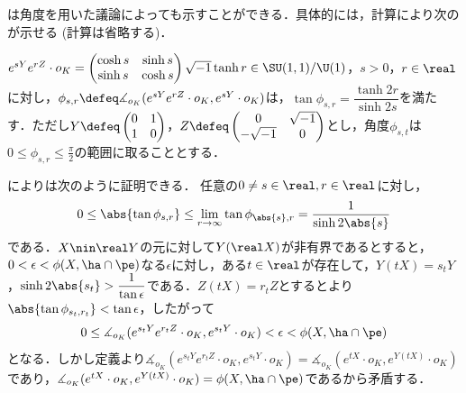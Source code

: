 \begin{rem}\label{rem:su11-by-angle}

  は角度を用いた議論によっても示すことができる．具体的には，計算により次のが示せる (計算は省略する)．
  \begin{lem}\label{lem:0106}
    $e^{sY}e^{rZ}\cdot o_K =
    \begin{pmatrix}
      \cosh s & \sinh s\\ \sinh s & \cosh s
    \end{pmatrix}
    \sqrt{-1}\tanh r \in \SU(1,1)/\U(1) $，$s > 0$，$r\in \real$に対し，$\phi_{s,r}\defeq \measuredangle_{o_K}(e^{sY}e^{rZ}\cdot o_K, e^{sY}\cdot o_K) $は，$\tan \phi_{s,r} = \dfrac{\tanh 2r}{\sinh 2s} $を満たす．ただし$Y \defeq
  \begin{pmatrix}
    0 & 1\\ 1 & 0
  \end{pmatrix}
  $，$Z \defeq \begin{pmatrix}
    0 & \sqrt{-1} \\ -\sqrt{-1} & 0
  \end{pmatrix}$とし，角度$\phi_{s,t} $は$0\leq \phi_{s,r}\leq \frac{\pi}{2} $の範囲に取ることとする．
  \end{lem}  

  によりは次のように証明できる．
  任意の$0\neq s\in \real, r\in \real $に対し，
  \begin{align}
    0 \leq \abs{\tan \phi_{s,r}} \leq  \lim_{r\to \infty}\tan \phi_{\abs{s},r} = \dfrac{1}{\sinh 2\abs{s}}\label{eq:0106}
  \end{align}
  である．$X\nin \real Y $の元に対して$Y(\real X) $が非有界であるとすると，$ 0 <  \epsilon < \phi(X,\ha\cap\pe)$なる$\epsilon$に対し，ある$t\in \real $が存在して，$Y(tX) = s_tY $，$\sinh 2\abs{s_t} > \dfrac{1}{\tan \epsilon} $である．$Z(tX) = r_tZ $とするとより$\abs{\tan \phi_{s_t,r_t}} < \tan \epsilon $，したがって
  \begin{align*}
    0\leq \measuredangle_{o_K}(e^{s_tY}e^{r_t Z}\cdot o_K, e^{s_tY}\cdot o_K) < \epsilon < \phi(X,\ha\cap\pe)
  \end{align*}
  となる．しかし定義より$\measuredangle_{o_K}(e^{s_tY}e^{r_t Z}\cdot o_K, e^{s_tY}\cdot o_K) = \measuredangle_{o_K}(e^{tX}\cdot o_K, e^{Y(tX) }\cdot o_K) $であり，$\measuredangle_{o_K}(e^{tX}\cdot o_K, e^{Y(tX) }\cdot o_K) = \phi(X,\ha\cap\pe)$であるから矛盾する． 

  
\end{rem}

